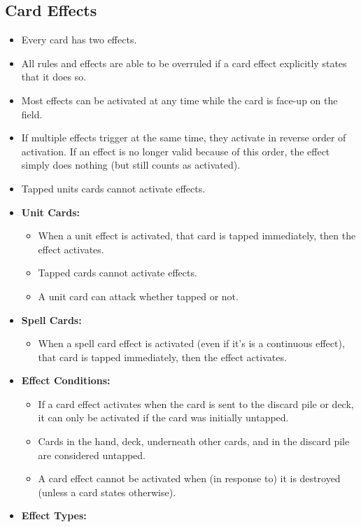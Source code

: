 \subsection{Card Effects\label{CardEffectsRuleSection}}
\begin{itemize}
    \item Every card has two effects.
    \item All rules and effects are able to be overruled if a card effect explicitly states that it does so.
    \item Most effects can be activated at any time while the card is face-up on the field.
    \item If multiple effects trigger at the same time, they activate in reverse order of activation. If an effect is no longer valid because of this order, the effect simply does nothing (but still counts as activated).
    \item Tapped units cards cannot activate effects.
    \item \textbf{Unit Cards:}
    \begin{itemize}
        \item When a unit effect is activated, that card is tapped immediately, then the effect activates.
        \item Tapped cards cannot activate effects.
        \item A unit card can attack whether tapped or not.
    \end{itemize}
    \item \textbf{Spell Cards:}
    \begin{itemize}
        \item When a spell card effect is activated (even if it's is a continuous effect), that card is tapped immediately, then the effect activates.
    \end{itemize}
    \item \textbf{Effect Conditions:}
    \begin{itemize}
        \item If a card effect activates when the card is sent to the discard pile or deck, it can only be activated if the card was initially untapped.
        \item Cards in the hand, deck, underneath other cards, and in the discard pile are considered untapped.
        \item A card effect cannot be activated when (in response to) it is destroyed (unless a card states otherwise).
    \end{itemize}
    \item \textbf{Effect Types:}

\end{itemize}
